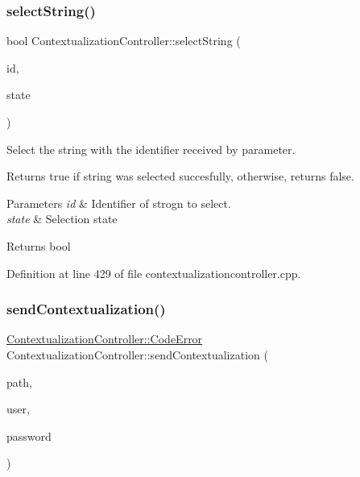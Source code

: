\subsubsection{\texorpdfstring{select\+String()}{selectString()}}
{\footnotesize\ttfamily bool Contextualization\+Controller\+::select\+String (\begin{DoxyParamCaption}\item[{const Q\+String}]{id,  }\item[{bool}]{state }\end{DoxyParamCaption})\hspace{0.3cm}{\ttfamily [protected]}}



Select the string with the identifier received by parameter. 

Returns true if string was selected succesfully, otherwise, returns false. 
\begin{DoxyParams}{Parameters}
{\em id} & Identifier of strogn to select. \\
\hline
{\em state} & Selection state \\
\hline
\end{DoxyParams}
\begin{DoxyReturn}{Returns}
bool 
\end{DoxyReturn}


Definition at line 429 of file contextualizationcontroller.\+cpp.

\mbox{\label{classContextualizationController_a46ec193d423be47137f34d746145801f}} 
\subsubsection{\texorpdfstring{send\+Contextualization()}{sendContextualization()}}
{\footnotesize\ttfamily \mbox{\hyperlink{classContextualizationController_acb38587f7f9e610a5950956b345d69fd}{Contextualization\+Controller\+::\+Code\+Error}} Contextualization\+Controller\+::send\+Contextualization (\begin{DoxyParamCaption}\item[{Q\+String const \&}]{path,  }\item[{Q\+String}]{user,  }\item[{Q\+String}]{password }\end{DoxyParamCaption})\hspace{0.3cm}{\ttfamily [protected]}}



